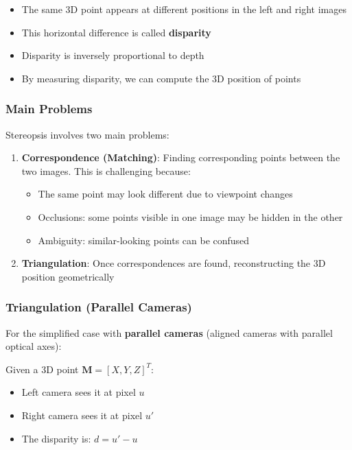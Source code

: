 \documentclass[11pt,a4paper]{article}
\theoremstyle{definition}
\theoremstyle{plain}
\theoremstyle{remark}
\begin{document}
\begin{tcolorbox}[colback=green!5!white,colframe=green!75!black,title=\textbf{Stereopsis Principle}]
\begin{itemize}
    \item The same 3D point appears at different positions in the left and right images
    \item This horizontal difference is called \textbf{disparity}
    \item Disparity is inversely proportional to depth
    \item By measuring disparity, we can compute the 3D position of points
\end{itemize}
\end{tcolorbox}

\subsubsection{Main Problems}

Stereopsis involves two main problems:

\begin{enumerate}
    \item \textbf{Correspondence (Matching)}: Finding corresponding points between the two images. This is challenging because:
    \begin{itemize}
        \item The same point may look different due to viewpoint changes
        \item Occlusions: some points visible in one image may be hidden in the other
        \item Ambiguity: similar-looking points can be confused
    \end{itemize}
    \item \textbf{Triangulation}: Once correspondences are found, reconstructing the 3D position geometrically
\end{enumerate}

\subsubsection{Triangulation (Parallel Cameras)}

For the simplified case with \textbf{parallel cameras} (aligned cameras with parallel optical axes):

Given a 3D point $\mathbf{M} = [X, Y, Z]^T$:
\begin{itemize}
    \item Left camera sees it at pixel $u$
    \item Right camera sees it at pixel $u'$
    \item The disparity is: $d = u' - u$
\end{itemize}
\end{document}
